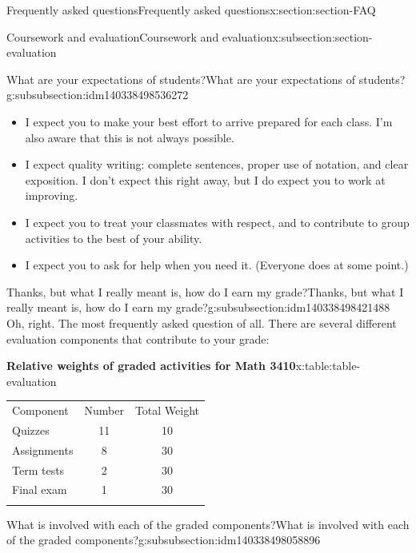 \documentclass[oneside,10pt,]{article}
\newcommand{\hrulethin}  {\noalign{\hrule height 0.04em}}
\begin{document}
\begin{sectionptx}{Frequently asked questions}{}{Frequently asked questions}{}{}{x:section:section-FAQ}
\begin{subsectionptx}{Coursework and evaluation}{}{Coursework and evaluation}{}{}{x:subsection:section-evaluation}
\typeout{************************************************}
%
\begin{subsubsectionptx}{What are your expectations of students?}{}{What are your expectations of students?}{}{}{g:subsubsection:idm140338498536272}
%
\begin{itemize}[label=\textbullet]
\item{}I expect you to make your best effort to arrive prepared for each class. I'm also aware that this is not always possible.%
\item{}I expect quality writing: complete sentences, proper use of notation, and clear exposition. I don't expect this right away, but I do expect you to work at improving.%
\item{}I expect you to treat your classmates with respect, and to contribute to group activities to the best of your ability.%
\item{}I expect you to ask for help when you need it. (Everyone does at some point.)%
\end{itemize}
%
\end{subsubsectionptx}
%
%
\typeout{************************************************}
\typeout{************************************************}
%
\begin{subsubsectionptx}{Thanks, but what I really meant is, how do I earn my grade?}{}{Thanks, but what I really meant is, how do I earn my grade?}{}{}{g:subsubsection:idm140338498421488}
Oh, right. The most frequently asked question of all. There are several different evaluation components that contribute to your grade:%
\begin{tableptx}{\textbf{Relative weights of graded activities for Math 3410}}{x:table:table-evaluation}{}%
\centering
\begin{tabular}{lcc}\hrulethin
Component&Number&Total Weight\tabularnewline\hrulethin
Quizzes&11&10\tabularnewline[0pt]
Assignments&8&30\tabularnewline[0pt]
Term tests&2&30\tabularnewline[0pt]
Final exam&1&30\tabularnewline\hrulethin
\end{tabular}
\end{tableptx}%
\end{subsubsectionptx}
%
%
\typeout{************************************************}
\typeout{************************************************}
%
\begin{subsubsectionptx}{What is involved with each of the graded components?}{}{What is involved with each of the graded components?}{}{}{g:subsubsection:idm140338498058896}

\end{subsubsectionptx}
\end{subsectionptx}
\end{sectionptx}
\end{document}
